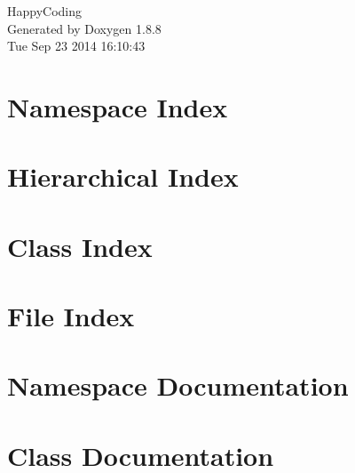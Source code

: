 \documentclass[twoside]{book}
\newcommand{\+}{\discretionary{\mbox{\scriptsize$\hookleftarrow$}}{}{}}
\newcommand{\clearemptydoublepage}{%
  \newpage{\pagestyle{empty}\cleardoublepage}%
}
\begin{document}
\hypersetup{pageanchor=false,
             bookmarks=true,
             bookmarksnumbered=true,
             pdfencoding=unicode
            }
\begin{titlepage}
\vspace*{7cm}
\begin{center}%
{\Large Happy\+Coding }\\
\vspace*{1cm}
{\large Generated by Doxygen 1.8.8}\\
\vspace*{0.5cm}
{\small Tue Sep 23 2014 16:10:43}\\
\end{center}
\end{titlepage}
\clearemptydoublepage
\tableofcontents
\clearemptydoublepage
{}
\hypersetup{pageanchor=true}

\chapter{Namespace Index}

\chapter{Hierarchical Index}

\chapter{Class Index}

\chapter{File Index}

\chapter{Namespace Documentation}

\chapter{Class Documentation}













\end{document}
